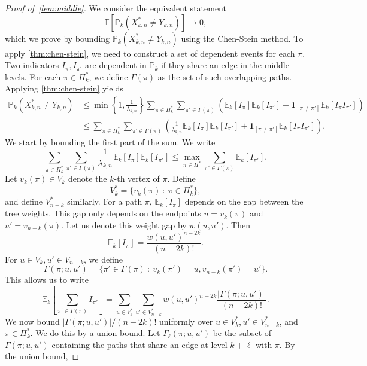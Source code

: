 \documentclass[11pt]{article}
\newtheorem{theorem}{Theorem}
\theoremstyle{definition}
\theoremstyle{remark}
\theoremstyle{remark}
\numberwithin{theorem}{section}
\providecommand{\P}{}
\renewcommand{\P}{\mathbb{P}}
\newcommand{\E}{\mathbb{E}}
\newcommand{\I}[1]{{\mathbf 1}_{[#1]}}
\begin{document}

\begin{proof}[Proof of~\cref{lem:middle}]
    We consider the equivalent statement
    \[
    \E\left[\P_k(X_{k,n}^{*}\neq Y_{k,n})\right]\to0,
    \]
    which we prove by bounding $\P_k(X_{k,n}^{*}\neq Y_{k,n})$ using the Chen-Stein method.
To apply \cref{thm:chen-stein}, we need to construct a set of dependent events for each $\pi$. Two indicators $I_\pi,I_{\pi'}$ are dependent in $\P_k$ if they share an edge in the middle levels. For each $\pi\in\Pi^*_{k}$, we define $\Gamma(\pi)$ as the set of such overlapping paths.
    Applying \cref{thm:chen-stein} yields
    \begin{align}
    \P_k(X_{k,n}^{*}\neq Y_{k,n})
    &\le \min\left\{1,\frac1{\lambda_{k,n}}\right\}
    \sum_{\pi\in\Pi^*_k}\sum_{\pi'\in\Gamma(\pi)}\left(\E_k[I_\pi]\E_k[I_{\pi'}]+\I{\pi\neq\pi'}\E_k[I_\pi I_{\pi'}]\right)\nonumber\\
    &\le \sum_{\pi\in\Pi^*_k}\sum_{\pi'\in\Gamma(\pi)}\left(\frac1{\lambda_{k,n}}\E_k[I_\pi]\E_k[I_{\pi'}]+\I{\pi\neq\pi'}\E_k[I_\pi I_{\pi'}]\right).\label{eq:chen-stein}
    \end{align}
    We start by bounding the first part of the sum. We write
    \[
    \sum_{\pi\in\Pi^*_k}\sum_{\pi'\in\Gamma(\pi)}\frac1{\lambda_{k,n}}\E_k[I_\pi]\E_k[I_{\pi'}]\le\max_{\pi\in\Pi^*}\sum_{\pi'\in\Gamma(\pi)}\E_k[I_{\pi'}].
    \]
    Let $v_k(\pi)\in V_k$ denote the $k$-th vertex of $\pi$. Define
    \[
    V_k^*=\{v_k(\pi)\ :\ \pi\in\Pi_{k}^*\},
    \]
    and define $V_{n-k}^*$ similarly. For a path $\pi$, $\E_k[I_{\pi}]$ depends on the gap between the tree weights. This gap only depends on the endpoints $u=v_k(\pi)$ and $u'=v_{n-k}(\pi)$. Let us denote this weight gap by $w(u,u')$. Then
    \[
    \E_k[I_{\pi}]=\frac{w(u,u')^{n-2k}}{(n-2k)!}.
    \]
    For $u\in V_k,u'\in V_{n-k}$, we define
    \[
    \Gamma(\pi;u,u')=\{\pi'\in \Gamma(\pi)\ :\ v_k(\pi')=u,v_{n-k}(\pi')=u'\}.
    \]
    This allows us to write
    \[
    \E_k\left[\sum_{\pi'\in\Gamma(\pi)}I_{\pi'}\right]=\sum_{u\in V_k^*}\sum_{u'\in V_{n-k}^*}w(u,u')^{n-2k}\frac{|\Gamma(\pi;u,u')|}{(n-2k)!}.
    \]
    We now bound $|\Gamma(\pi;u,u')|/(n-2k)!$ uniformly over $u\in V_k^*,u'\in V_{n-k}^*$, and $\pi \in \Pi_{k}^{*}$. We do this by a union bound. Let $\Gamma_\ell(\pi;u,u')$ be the subset of $\Gamma(\pi;u,u')$ containing the paths that share an edge at level $k+\ell$ with $\pi$. By the union bound,

\end{proof}
\end{document}
